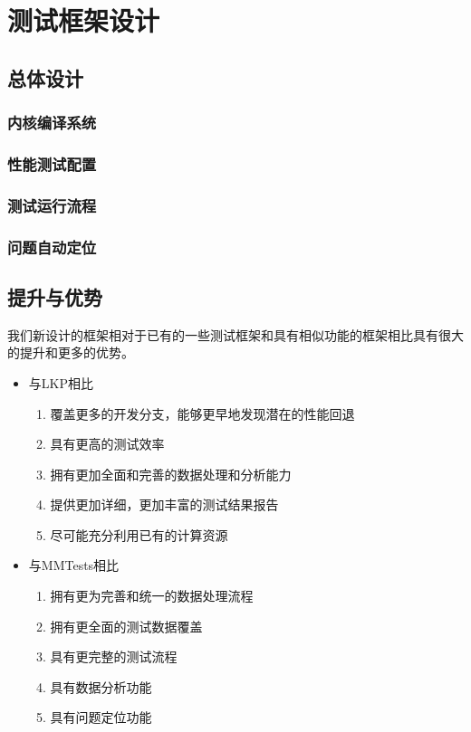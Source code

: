 

\chapter{测试框架设计}


\section{总体设计}

\subsection{内核编译系统}

\subsection{性能测试配置}

\subsection{测试运行流程}

\subsection{问题自动定位}


\section{提升与优势}

我们新设计的框架相对于已有的一些测试框架和具有相似功能的框架相比具有很大的提升和更多的优势。

\begin{itemize}
\item 与LKP相比

\begin{enumerate}
\item 覆盖更多的开发分支，能够更早地发现潜在的性能回退
\item 具有更高的测试效率
\item 拥有更加全面和完善的数据处理和分析能力
\item 提供更加详细，更加丰富的测试结果报告
\item 尽可能充分利用已有的计算资源
\end{enumerate}

\item 与MMTests相比

\begin{enumerate}
\item 拥有更为完善和统一的数据处理流程
\item 拥有更全面的测试数据覆盖
\item 具有更完整的测试流程
\item 具有数据分析功能
\item 具有问题定位功能
\end{enumerate}

\end{itemize}